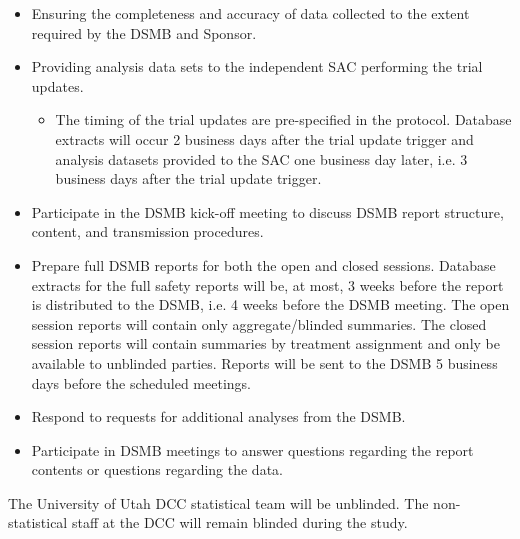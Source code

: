 \documentclass[12pt]{article}
\begin{document}
\begin{itemize}
\item Ensuring the completeness and accuracy of data collected to the extent required by the DSMB and Sponsor.
\item Providing analysis data sets to the independent SAC performing the trial updates.
	\begin{itemize}
	\item The timing of the trial updates are pre-specified in the protocol.  Database extracts will occur 2 business days after the trial update trigger and analysis datasets provided to the SAC one business day later, i.e. 3 business days after the trial update trigger.
	\end{itemize}
\item Participate in the DSMB kick-off meeting to discuss DSMB report structure, content, and transmission procedures.
\item Prepare full DSMB reports for both the open and closed sessions. Database extracts for the full safety reports will be, at most, 3 weeks before the report is distributed to the DSMB, i.e. 4 weeks before the DSMB meeting.  The open session reports will contain only aggregate/blinded summaries.  The closed session reports will contain summaries by treatment assignment and only be available to unblinded parties.  Reports will be sent to the DSMB 5 business days before the scheduled meetings.
\item Respond to requests for additional analyses from the DSMB.
\item Participate in DSMB meetings to answer questions regarding the report contents or questions regarding the data.
\end{itemize}	

The University of Utah DCC statistical team will be unblinded.  The non-
statistical staff at the DCC will remain blinded during the study.
\end{document}
